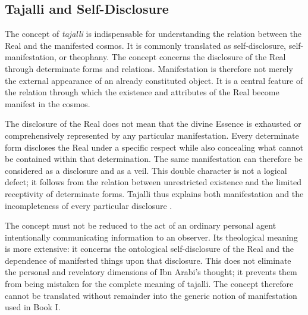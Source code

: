 
\subsection{Tajalli and Self-Disclosure}
\label{subsec:ch08_s16_ss07}

\label{para:VS.B01.P01.C08.S16.SS07.P001}

The concept of \textit{tajalli} is indispensable for
understanding the relation between the Real and the
manifested cosmos. It is commonly translated as
self-disclosure, self-manifestation, or theophany.
The concept concerns the disclosure of the Real through
determinate forms and relations. Manifestation is
therefore not merely the external appearance of an
already constituted object. It is a central feature
of the relation through which the existence and
attributes of the Real become manifest in the cosmos.

\label{para:VS.B01.P01.C08.SS07.P002}

The disclosure of the Real does not mean that the
divine Essence is exhausted or comprehensively
represented by any particular manifestation. Every
determinate form discloses the Real under a specific
respect while also concealing what cannot be contained
within that determination. The same manifestation
can therefore be considered as a disclosure and as
a veil. This double character is not a logical defect;
it follows from the relation between unrestricted
existence and the limited receptivity of determinate
forms. Tajalli thus explains both manifestation and
the incompleteness of every particular disclosure
\citep{ChittickSelfDisclosureGod1998}.

\label{para:VS.B01.P01.C08.SS07.P003}

The concept must not be reduced to the act of an
ordinary personal agent intentionally communicating
information to an observer. Its theological meaning
is more extensive: it concerns the ontological
self-disclosure of the Real and the dependence of
manifested things upon that disclosure. This does
not eliminate the personal and revelatory dimensions
of Ibn Arabi's thought; it prevents them from being
mistaken for the complete meaning of tajalli.
The concept therefore cannot be translated without
remainder into the generic notion of manifestation
used in Book I.

